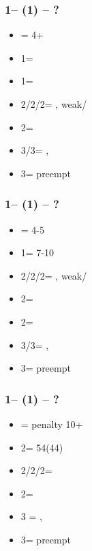 \documentclass[12pt, a4paper]{report}
\begin{document}
{{{            \subsubsection*{1\diams -- (1\hearts) -- ?}
            \begin{itemize}
                \item \dbl = 4+\spades
                \item 1\spades = \nt
                \item 1\nt = \inv
                \item 2\clubs/2\hearts/2\spades = \trsf{\diams/\spades/\clubs}, weak/\gf
                \item 2\diams = \diams\ \inv
                \item 3\clubs/3\spades = \nat, \inv
                \item 3\diams = preempt
            \end{itemize}

            \subsubsection*{1\diams -- (1\spades) -- ?}
            \begin{itemize}
                \item \dbl = 4-5\hearts
                \item 1\nt = 7-10
                \item 2\clubs/2\diams/2\spades = \trsf{\diams/\hearts/\clubs}, weak/\gf
                \item 2\hearts = \diams\ \inv
                \item 2\nt = \inv
                \item 3\clubs/3\hearts = \nat, \inv
                \item 3\diams = preempt
            \end{itemize}

            \subsubsection*{1\diams -- (1\nt) -- ?}
            \begin{itemize}
                \item \dbl = penalty 10+
                \item 2\clubs = 54\major (44)
                \item 2\diams/2\hearts/2\spades = \nf
                \item 2\nt = \inv\ \diams
                \item 3 = \nat, \inv\ \unbal
                \item 3\diams = preempt
            \end{itemize}

}}}
\end{document}
